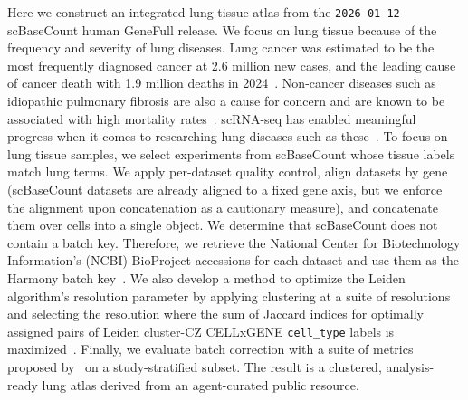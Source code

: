 \documentclass[10pt,letterpaper]{article}
\begin{document}


Here we construct an integrated lung-tissue atlas from the \texttt{2026-01-12} scBaseCount human GeneFull release. We focus on lung tissue because of the frequency and severity of lung diseases. Lung cancer was estimated to be the most frequently diagnosed cancer at 2.6 million new cases, and the leading cause of cancer death with 1.9 million deaths in 2024~\parencite{sungGlobalCancerStatistics2026}. Non-cancer diseases such as idiopathic pulmonary fibrosis are also a cause for concern and are known to be associated with high mortality rates~\parencite{chakrabortyEmergingRolesAirway2022}. scRNA-seq has enabled meaningful progress when it comes to researching lung diseases such as these~\parencite{navinTumourEvolutionInferred2011,chakrabortyEmergingRolesAirway2022}. To focus on lung tissue samples, we select experiments from scBaseCount whose tissue labels match lung terms. We apply per-dataset quality control, align datasets by gene (scBaseCount datasets are already aligned to a fixed gene axis, but we enforce the alignment upon concatenation as a cautionary measure), and concatenate them over cells into a single object. We determine that scBaseCount does not contain a batch key. Therefore, we retrieve the National Center for Biotechnology Information's (NCBI) BioProject accessions for each dataset and use them as the Harmony batch key~\parencite{barrettBioProjectBioSampleDatabases2012,korsunskyFastSensitiveAccurate2019}. We also develop a method to optimize the Leiden algorithm's resolution parameter by applying clustering at a suite of resolutions and selecting the resolution where the sum of Jaccard indices for optimally assigned pairs of Leiden cluster-CZ CELLxGENE \texttt{cell_type} labels is maximized~\parencite{traagLouvainLeidenGuaranteeing2019}. Finally, we evaluate batch correction with a suite of metrics proposed by~\textcite{lueckenBenchmarkingAtlaslevelData2022} on a study-stratified subset. The result is a clustered, analysis-ready lung atlas derived from an agent-curated public resource. 
\end{document}
